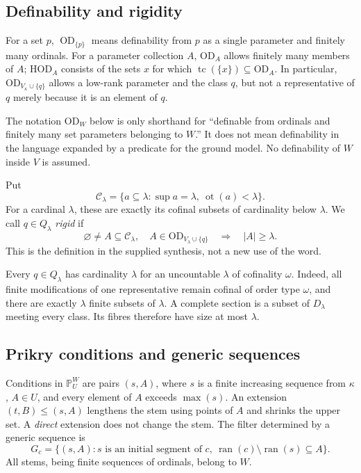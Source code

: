 \documentclass[11pt,letterpaper]{article}
\theoremstyle{definition}
\numberwithin{equation}{section}
\newcommand{\HOD}{\mathrm{HOD}}
\newcommand{\OD}{\mathrm{OD}}
\newcommand{\PPU}{\mathbb P_U}
\newcommand{\ODp}[1]{\operatorname{OD}_{\{#1\}}}
\newcommand{\Cof}{\mathcal C}
\begin{document}
\subsection{Definability and rigidity}

For a set $p$, $\ODp{p}$ means definability from $p$ as a single parameter and finitely many ordinals. For a parameter collection $A$, $\OD_A$ allows finitely many members of $A$; $\HOD_A$ consists of the sets $x$ for which $\operatorname{tc}(\{x\})\subseteq\OD_A$. In particular, $\OD_{V_\kappa\cup\{q\}}$ allows a low-rank parameter and the class $q$, but not a representative of $q$ merely because it is an element of $q$.

The notation $\OD_W$ below is only shorthand for ``definable from ordinals and finitely many set parameters belonging to $W$.'' It does not mean definability in the language expanded by a predicate for the ground model. No definability of $W$ inside $V$ is assumed.

Put
\[
 \Cof_\lambda=\{a\subseteq\lambda:\sup a=\lambda,\ \operatorname{ot}(a)<\lambda\}.
\]
For a cardinal $\lambda$, these are exactly its cofinal subsets of cardinality below $\lambda$. We call $q\in Q_\lambda$ \emph{rigid} if
\begin{equation}\label{eq:rigidity}
 \varnothing\ne A\subseteq\Cof_\lambda,
 \quad A\in\OD_{V_\lambda\cup\{q\}}
 \quad\Longrightarrow\quad |A|\ge\lambda.
\end{equation}
This is the definition in the supplied synthesis, not a new use of the word.

Every $q\in Q_\lambda$ has cardinality $\lambda$ for an uncountable $\lambda$ of cofinality $\omega$. Indeed, all finite modifications of one representative remain cofinal of order type $\omega$, and there are exactly $\lambda$ finite subsets of $\lambda$. A complete section is a subset of $D_\lambda$ meeting every class. Its fibres therefore have size at most $\lambda$.

\subsection{Prikry conditions and generic sequences}

Conditions in $\PPU^W$ are pairs $(s,A)$, where $s$ is a finite increasing sequence from $\kappa$, $A\in U$, and every element of $A$ exceeds $\max(s)$. An extension $(t,B)\le(s,A)$ lengthens the stem using points of $A$ and shrinks the upper set. A \emph{direct} extension does not change the stem. The filter determined by a generic sequence is
\[
 G_c=\{(s,A):s\text{ is an initial segment of }c,
                 \ \operatorname{ran}(c)\setminus\operatorname{ran}(s)\subseteq A\}.
\]
All stems, being finite sequences of ordinals, belong to $W$.
\end{document}
